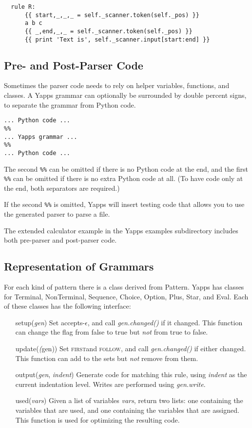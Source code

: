 \documentclass[10pt]{article}
\newcommand{\mysubsection}[1]{\subsection{\textcolor{darkerblue}{#1}}}
\newcommand{\first}{\textsc{first}}
\newcommand{\follow}{\textsc{follow}}
\begin{document}
\begin{verbatim}
  rule R: 
      {{ start,_,_,_ = self._scanner.token(self._pos) }}
      a b c 
      {{ _,end,_,_ = self._scanner.token(self._pos) }}
      {{ print 'Text is', self._scanner.input[start:end] }}
\end{verbatim}

\mysubsection{Pre- and Post-Parser Code}

Sometimes the parser code needs to rely on helper variables,
functions, and classes.  A Yapps grammar can optionally be surrounded
by double percent signs, to separate the grammar from Python code.

\begin{verbatim}
... Python code ...
%%
... Yapps grammar ...
%%
... Python code ...
\end{verbatim}

The second \verb|%%| can be omitted if there is no Python code at the
end, and the first \verb|%%| can be omitted if there is no extra
Python code at all.  (To have code only at the end, both separators
are required.)

If the second \verb|%%| is omitted, Yapps will insert testing code
that allows you to use the generated parser to parse a file.

The extended calculator example in the Yapps examples subdirectory
includes both pre-parser and post-parser code.

\mysubsection{Representation of Grammars}

For each kind of pattern there is a class derived from Pattern.  Yapps 
has classes for Terminal, NonTerminal, Sequence, Choice, Option, Plus, 
Star, and Eval.  Each of these classes has the following interface:

\begin{itemize}
 \item[setup(\emph{gen})] Set accepts-$\epsilon$, and call
   \emph{gen.changed()} if it changed.  This function can change the
   flag from false to true but \emph{not} from true to false.
 \item[update(\emph(gen))] Set \first and \follow, and call
   \emph{gen.changed()} if either changed.  This function can add to
   the sets but \emph{not} remove from them.
 \item[output(\emph{gen}, \emph{indent})] Generate code for matching
   this rule, using \emph{indent} as the current indentation level.
   Writes are performed using \emph{gen.write}.
 \item[used(\emph{vars})] Given a list of variables \emph{vars},
   return two lists: one containing the variables that are used, and
   one containing the variables that are assigned.  This function is
   used for optimizing the resulting code.
\end{itemize}
\end{document}
